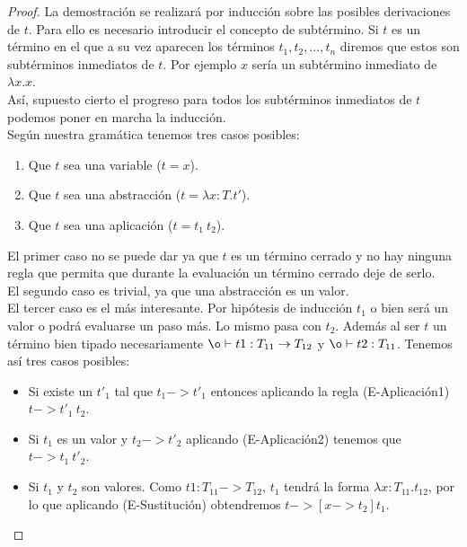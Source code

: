 \begin{proof}
  La demostración se realizará por inducción sobre las posibles derivaciones de $t$. Para ello es necesario introducir el concepto de subtérmino. Si $t$ es un término en el que a su vez aparecen los términos $t_1, t_2, ..., t_n$ diremos que estos son subtérminos inmediatos de $t$. Por ejemplo $x$ sería un subtérmino inmediato de $\lambda x.x$.\\
  
  Así, supuesto cierto el progreso para todos los subtérminos inmediatos de $t$ podemos poner en marcha la inducción.\\
  
  Según nuestra gramática tenemos tres casos posibles:
  \begin{enumerate}
    \item Que $t$ sea una variable ($t = x$).
    \item Que $t$ sea una abstracción ($t = \lambda x:T.t'$).
    \item Que $t$ sea una aplicación ($t = t_1\ t_2$).
  \end{enumerate}
  
  El primer caso no se puede dar ya que $t$ es un término cerrado y no hay ninguna regla que permita que durante
  la evaluación un término cerrado deje de serlo.\\
  
  El segundo caso es trivial, ya que una abstracción es un valor.\\
  
  El tercer caso es el más interesante. Por hipótesis de inducción $t_1$ o bien será un valor o podrá evaluarse un paso más. Lo mismo pasa con $t_2$. Además al ser $t$ un término bien tipado necesariamente $\o |- t1:T_{11} -> T_{12}$ y $\o |- t2:T_{11}$. Tenemos así tres casos posibles:\\
  
  \begin{itemize}
    \item Si existe un $t'_1$ tal que $t_1 -> t'_1$ entonces aplicando la regla (E-Aplicación1) $t -> t'_1\ t_2$.
    
    \item Si $t_1$ es un valor y $t_2 -> t'_2$ aplicando (E-Aplicación2) tenemos que $t -> t_1\ t'_2$.
    
    \item Si $t_1$ y $t_2$ son valores. Como $t1:T_{11} -> T_{12}$, $t_1$ tendrá la forma $\lambda x:T_{11}.t_{12}$, por lo que aplicando (E-Sustitución) obtendremos $t -> [x -> t_2]t_1$.
  \end{itemize}
  
\end{proof}


